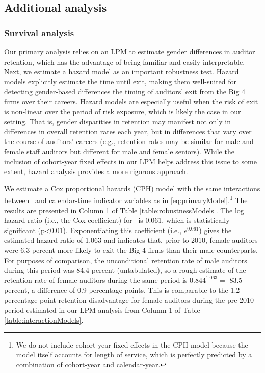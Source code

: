 \documentclass[11pt]{article}
\begin{document}
    \subsection{Additional analysis}\label{section:robustnessTests}

        \subsubsection{Survival analysis}\label{section:survivalAnalysis}
            Our primary analysis relies on an LPM to estimate gender differences in auditor retention, which has the advantage of being familiar and easily interpretable. Next, we estimate a hazard model as an important robustness test. Hazard models explicitly estimate the time until exit, making them well-suited for detecting gender-based differences the timing of auditors' exit from the Big 4 firms over their careers. Hazard models are especially useful when the risk of exit is non-linear over the period of risk exposure, which is likely the case in our setting. That is, gender disparities in retention may manifest not only in differences in overall retention rates each year, but in differences that vary over the course of auditors' careers (e.g., retention rates may be similar for male and female staff auditors but different for male and female seniors). While the inclusion of cohort-year fixed effects in our LPM helps address this issue to some extent, hazard analysis provides a more rigorous approach. 

            We estimate a Cox proportional hazards (CPH) model \parencite{coxRegressionModelsLifeTables1972,statacorpStcoxCoxProportional2023} with the same interactions between \FEMALE\ and calendar-time indicator variables as in \ref{eq:primaryModel}.\footnote{We do not include cohort-year fixed effects in the CPH model because the model itself accounts for length of service, which is perfectly predicted by a combination of cohort-year and calendar-year.} The results are presented in Column 1 of Table \ref{table:robustnessModels}. The log hazard ratio (i.e., the Cox coefficient) for \FEMALExPREX\ is 0.061, which is statistically significant (p<0.01). Exponentiating this coefficient (i.e., $e^{0.061}$) gives the estimated hazard ratio of 1.063 and indicates that, prior to 2010, female auditors were 6.3 percent more likely to exit the Big 4 firms than their male counterparts. For purposes of comparison, the unconditional retention rate of male auditors during this period was 84.4 percent (untabulated), so a rough estimate of the retention rate of female auditors during the same period is $0.844^{1.063} =$ 83.5 percent, a difference of 0.9 percentage points. This is comparable to the 1.2 percentage point retention disadvantage for female auditors during the pre-2010 period estimated in our LPM analysis from Column 1 of Table \ref{table:interactionModels}. 
            
\end{document}
